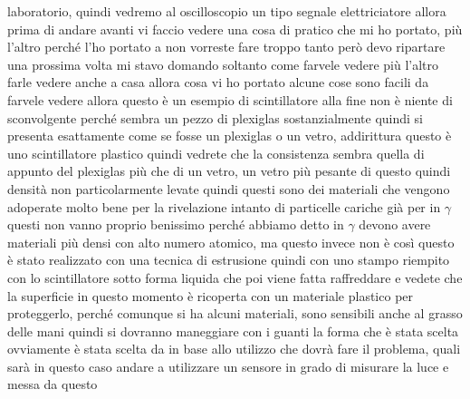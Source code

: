 {laboratorio, quindi vedremo al oscilloscopio un tipo segnale elettriciatore allora prima di andare avanti vi faccio vedere una cosa di pratico che mi ho portato, più l'altro perché l'ho portato a non vorreste fare troppo tanto però devo ripartare una prossima volta mi stavo domando soltanto come farvele vedere più l'altro farle vedere anche a casa allora cosa vi ho portato alcune cose sono facili da farvele vedere allora questo è un esempio di scintillatore alla fine non è niente di sconvolgente perché sembra un pezzo di plexiglas sostanzialmente quindi si presenta esattamente come se fosse un plexiglas o un vetro, addirittura questo è uno scintillatore plastico quindi vedrete che la consistenza sembra quella di appunto del plexiglas più che di un vetro, un vetro più pesante di questo quindi densità non particolarmente levate quindi questi sono dei materiali che vengono adoperate molto bene per la rivelazione intanto di particelle cariche già per in $\gamma$ questi non vanno proprio benissimo perché abbiamo detto in $\gamma$ devono avere materiali più densi con alto numero atomico, ma questo invece non è così questo è stato realizzato con una tecnica di estrusione quindi con uno stampo riempito con lo scintillatore sotto forma liquida che poi viene fatta raffreddare e vedete che la superficie in questo momento è ricoperta con un materiale plastico per proteggerlo, perché comunque si ha alcuni materiali, sono sensibili anche al grasso delle mani quindi si dovranno maneggiare con i guanti la forma che è stata scelta ovviamente è stata scelta da in base allo utilizzo che dovrà fare il problema, quali sarà in questo caso andare a utilizzare un sensore in grado di misurare la luce e messa da questo 

}
